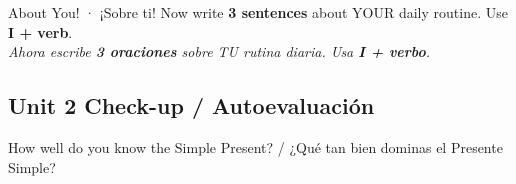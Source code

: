 \vspace{14pt}

\begin{activity}{About You! · ¡Sobre ti!}
Now write \textbf{3 sentences} about YOUR daily routine. Use \textbf{I + verb}. \\
\textit{Ahora escribe \textbf{3 oraciones} sobre TU rutina diaria. Usa \textbf{I + verbo}.}

\writinglines[5]
\end{activity}

\vspace{10pt}

\subsection*{ Unit 2 Check-up / Autoevaluación}

{\color{kidsGray}How well do you know the Simple Present? / ¿Qué tan bien dominas el Presente Simple?}

\bigskip
\begin{center}
\selfcheck[3]
\end{center}
